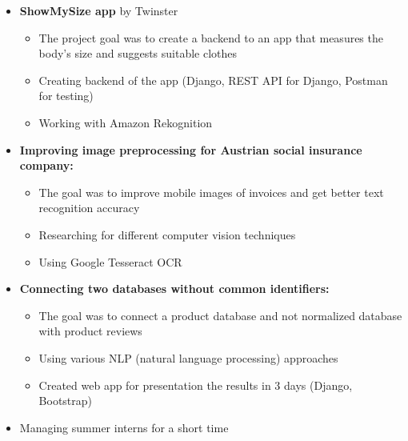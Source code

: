\documentclass[10pt,a4paper,ragged2e,withhyper, normalphoto]{altacv}
\begin{document}
\begin{paracol}{2}
\begin{itemize}
        \item \textcolor{DarkPastelRed}{\textbf{ShowMySize app} by Twinster}
        \begin{itemize}
            \item The project goal was to create a backend to an app that measures the body's size and suggests suitable clothes
            \item Creating backend of the app (Django, REST API for Django, Postman for testing)
            \item Working with Amazon Rekognition
        \end{itemize}
        \item \textbf{\textcolor{DarkPastelRed}{Improving image preprocessing for Austrian social insurance company:}}
        \begin{itemize}
            \item The goal was to improve mobile images of invoices and get better text recognition accuracy 
            \item Researching for different computer vision techniques
            \item Using Google Tesseract OCR
        \end{itemize}
        \item \textcolor{DarkPastelRed}{\textbf{Connecting two databases without common identifiers:}}
        \begin{itemize}
            \item The goal was to connect a product database and not normalized database with product reviews 
            \item Using various NLP (natural language processing) approaches
            \item Created web app for presentation the results in 3 days (Django, Bootstrap)
        \end{itemize}
        \item Managing summer interns for a short time
    \end{itemize}
    

\end{paracol}
\end{document}
